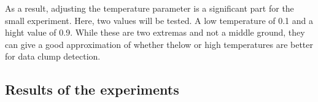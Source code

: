 As a result, adjusting the temperature parameter is a significant part for the small experiment. Here, two values will be tested. A low temperature of 0.1 and a hight value of 0.9. While these are two extremas and not a middle ground, they can give a good approximation of whether thelow or high temperatures are better for data clump detection. 

\begin{comment}
\subsection{Requesting follow-ups}

As outlined in section \ref{sec:chain of thought},  one prompt might no be enough to refactor data clumps. This might also apply for the simpler task of detecting data clumps.

Instead of expecting that a single request will detect all data clumps, another approach would be to repeat the same requests multiple times and aggregate the results. These follow-up prompts result in ChatGPT to re-analyze the code so that more data clumps can be found. 

The issue  with follow-up prompts is how often should a prompt be repeated. Each prompt repeat requires that the conversation history to be sent again because ChatGPT is stateless. This leads to higher resource usage and costs. There are multiple approach to implement follow up.

\begin{description}
\item[Full project follow-up] The whole project (all relevant files) is sent to  ChatGPT again with an instruction to find more data clumps. As a result, more data is sent per  request while the number of request can be reduced. As a  result, ChatGPt might find additional data clumps that it has not found during the previous prompts.
\item [Tuple-based follow-up] A tuple of two files in the project (i.~e. the content of those files) is sent again to ChatGPT with the instruction to find more data clumps. If the goal is to data clumps between tuples of all files, $0.5*n*(n-1)$ file tuples need to uploaded so that many requests will needed. However, this can help ChatGPT to focus on a smaller part of the software project to analyze in order to find more data clumps.
\end{description}
\end{comment}

\subsection{Results of the experiments}\label{sec:initial_experiments}

